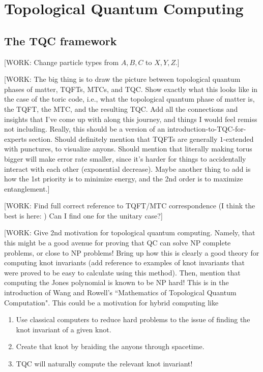 \documentclass{article}
\theoremstyle{definition}
\numberwithin{figure}{section}
\begin{document}
\section{Topological Quantum Computing}
\label{Topological Quantum Computing}

\subsection{The TQC framework}
\label{The TQC framework}

[WORK: Change particle types from $A,B,C$ to $X,Y,Z$.]

[WORK: The big thing is to draw the picture between topological quantum phases of matter, TQFTs, MTCs, and TQC. Show exactly what this looks like in the case of the toric code, i.e., what the topological quantum phase of matter is, the TQFT, the MTC, and the resulting TQC. Add all the connections and insights that I've come up with along this journey, and things I would feel remiss not including. Really, this should be a version of an introduction-to-TQC-for-experts section. Should definitely mention that TQFTs are generally $1$-extended with punctures, to visualize anyons. Should mention that literally making torus bigger will make error rate smaller, since it's harder for things to accidentally interact with each other (exponential decrease). Maybe another thing to add is how the 1st priority is to minimize energy, and the 2nd order is to maximize entanglement.]


[WORK: Find full correct reference to TQFT/MTC correspondence (I think the best is here: \cite{bartlett2015modular}) Can I find one for the unitary case?]

[WORK: Give 2nd motivation for topological quantum computing. Namely, that this might be a good avenue for proving that QC can solve NP complete problems, or close to NP problems! Bring up how this is clearly a good theory for computing knot invariants (add reference to examples of knot invariants that were proved to be easy to calculate using this method). Then, mention that computing the Jones polynomial is known to be NP hard! This is in the introduction of Wang and Rowell's ``Mathematics of Topological Quantum Computation". This could be a motivation for hybrid computing like

\begin{enumerate}
\item Use classical computers to reduce hard problems to the issue of finding the knot invariant of a given knot.
\item Create that knot by braiding the anyons through spacetime.
\item TQC will naturally compute the relevant knot invariant!
\end{enumerate}
\end{document}
